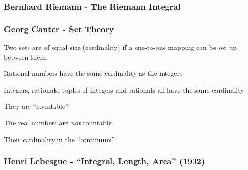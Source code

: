 \documentclass{beamer}
\begin{document}
\begin{frame}
\frametitle{Bernhard Riemann - The Riemann Integral}
\end{frame}

\begin{frame}
\frametitle{Georg Cantor - Set Theory}

Two sets are of equal size (cardinality) if a one-to-one mapping can be set up between them.

Rational numbers have the same cardinality as the integers

Integers, rationals, tuples of integers and rationals all have the same cardinality

They are ``countable''

The real numbers are {\it not} countable.

Their cardinality in the ``continuum''
\end{frame}

\begin{frame}
\frametitle{Henri Lebesgue - ``Integral, Length, Area'' (1902)}


\end{frame}
\end{document}
